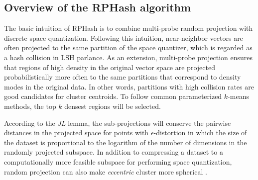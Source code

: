 \subsection{Overview of the RPHash algorithm} 

The basic intuition of \textsf{RPHash} is to combine multi-probe random projection with discrete space quantization.
Following this intuition, near-neighbor vectors are often projected to the same partition of the space quantizer, which
is regarded as a hash collision in LSH parlance.  As an extension, multi-probe projection ensures that regions of high
density in the original vector space are projected probabilistically more often to the same partitions that correspond
to density modes in the original data.  In other words, partitions with high collision rates are good candidates for
cluster centroids.  To follow common parameterized $k$-means methods, the top $k$ densest regions will be selected.

According to the \emph{JL} lemma, the sub-projections will conserve the pairwise distances in the projected space for
points with $\epsilon$-distortion in which the size of the dataset is proportional to the logarithm of the number of
dimensions in the randomly projected subspace.  In addition to compressing a dataset to a computationally more feasible
subspace for performing space quantization, random projection can also make \emph{eccentric} cluster more spherical
\cite{Dasgupta2000,vempala}.

